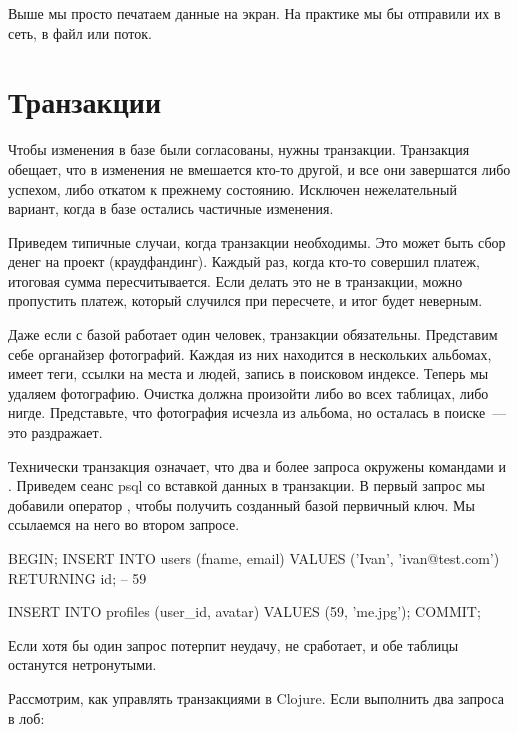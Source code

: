 Выше мы просто печатаем данные на экран. На практике мы бы отправили их в сеть, в файл или поток.

\section{Транзакции}


Чтобы изменения в базе были согласованы, нужны транзакции. Транзакция обещает, что в изменения не вмешается кто-то другой, и все они завершатся либо успехом, либо откатом к прежнему состоянию. Исключен нежелательный вариант, когда в базе остались частичные изменения.

Приведем типичные случаи, когда транзакции необходимы. Это может быть сбор денег на проект (краудфандинг). Каждый раз, когда кто-то совершил платеж, итоговая сумма пересчитывается. Если делать это не в транзакции, можно пропустить платеж, который случился при пересчете, и итог будет неверным.

Даже если с базой работает один человек, транзакции обязательны. Представим себе органайзер фотографий. Каждая из них находится в нескольких альбомах, имеет теги, ссылки на места и людей, запись в поисковом индексе. Теперь мы удаляем фотографию. Очистка должна произойти либо во всех таблицах, либо нигде. Представьте, что фотография исчезла из альбома, но осталась в поиске~--- это раздражает.


Технически транзакция означает, что два и более запроса окружены командами  и . Приведем сеанс psql со вставкой данных в транзакции. В первый запрос мы добавили оператор , чтобы получить созданный базой первичный ключ. Мы ссылаемся на него во втором запросе.

\begin{english}
  \begin{sql}
BEGIN;
INSERT INTO users (fname, email)
VALUES ('Ivan', 'ivan@test.com') RETURNING id;
-- 59

INSERT INTO profiles (user_id, avatar)
VALUES (59, 'me.jpg');
COMMIT;
  \end{sql}
\end{english}

Если хотя бы один запрос потерпит неудачу,  не сработает, и обе таблицы останутся нетронутыми.

Рассмотрим, как управлять транзакциями в Clojure. Если выполнить два запроса в лоб:

